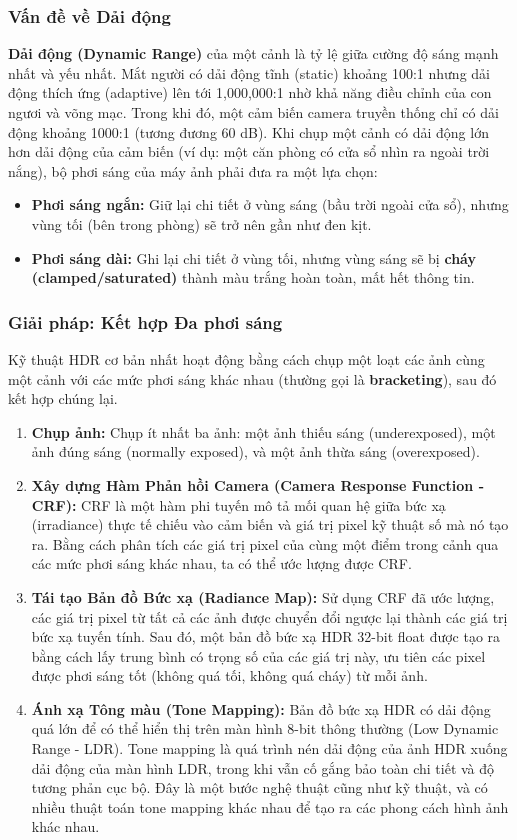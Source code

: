 \subsubsection{Vấn đề về Dải động}
\label{subsubsec:dynamic_range_problem}
\textbf{Dải động (Dynamic Range)} của một cảnh là tỷ lệ giữa cường độ sáng mạnh nhất và yếu nhất. Mắt người có dải động tĩnh (static) khoảng 100:1 nhưng dải động thích ứng (adaptive) lên tới 1,000,000:1 nhờ khả năng điều chỉnh của con ngươi và võng mạc. Trong khi đó, một cảm biến camera truyền thống chỉ có dải động khoảng 1000:1 (tương đương 60 dB).
Khi chụp một cảnh có dải động lớn hơn dải động của cảm biến (ví dụ: một căn phòng có cửa sổ nhìn ra ngoài trời nắng), bộ phơi sáng của máy ảnh phải đưa ra một lựa chọn:
\begin{itemize}
    \item \textbf{Phơi sáng ngắn:} Giữ lại chi tiết ở vùng sáng (bầu trời ngoài cửa sổ), nhưng vùng tối (bên trong phòng) sẽ trở nên gần như đen kịt.
    \item \textbf{Phơi sáng dài:} Ghi lại chi tiết ở vùng tối, nhưng vùng sáng sẽ bị \textbf{cháy (clamped/saturated)} thành màu trắng hoàn toàn, mất hết thông tin.
\end{itemize}

\subsubsection{Giải pháp: Kết hợp Đa phơi sáng}
\label{subsubsec:multi_exposure_fusion}
Kỹ thuật HDR cơ bản nhất \cite{Debevec1997} hoạt động bằng cách chụp một loạt các ảnh cùng một cảnh với các mức phơi sáng khác nhau (thường gọi là \textbf{bracketing}), sau đó kết hợp chúng lại.
\begin{enumerate}
    \item \textbf{Chụp ảnh:} Chụp ít nhất ba ảnh: một ảnh thiếu sáng (underexposed), một ảnh đúng sáng (normally exposed), và một ảnh thừa sáng (overexposed).
    \item \textbf{Xây dựng Hàm Phản hồi Camera (Camera Response Function - CRF):} CRF là một hàm phi tuyến mô tả mối quan hệ giữa bức xạ (irradiance) thực tế chiếu vào cảm biến và giá trị pixel kỹ thuật số mà nó tạo ra. Bằng cách phân tích các giá trị pixel của cùng một điểm trong cảnh qua các mức phơi sáng khác nhau, ta có thể ước lượng được CRF.
    \item \textbf{Tái tạo Bản đồ Bức xạ (Radiance Map):} Sử dụng CRF đã ước lượng, các giá trị pixel từ tất cả các ảnh được chuyển đổi ngược lại thành các giá trị bức xạ tuyến tính. Sau đó, một bản đồ bức xạ HDR 32-bit float được tạo ra bằng cách lấy trung bình có trọng số của các giá trị này, ưu tiên các pixel được phơi sáng tốt (không quá tối, không quá cháy) từ mỗi ảnh.
    \item \textbf{Ánh xạ Tông màu (Tone Mapping):} Bản đồ bức xạ HDR có dải động quá lớn để có thể hiển thị trên màn hình 8-bit thông thường (Low Dynamic Range - LDR). Tone mapping là quá trình nén dải động của ảnh HDR xuống dải động của màn hình LDR, trong khi vẫn cố gắng bảo toàn chi tiết và độ tương phản cục bộ. Đây là một bước nghệ thuật cũng như kỹ thuật, và có nhiều thuật toán tone mapping khác nhau để tạo ra các phong cách hình ảnh khác nhau.
\end{enumerate}


